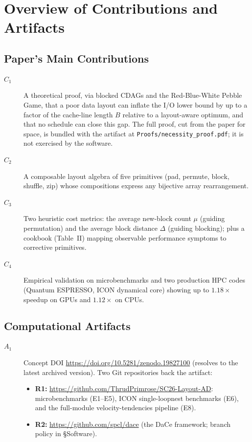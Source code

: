 \documentclass[conference]{IEEEtran}
\begin{document}


\appendixAD

\section{Overview of Contributions and Artifacts}

\subsection{Paper's Main Contributions}

\begin{description}
\item[$C_1$] A theoretical proof, via blocked CDAGs and the Red-Blue-White Pebble Game, that a poor data layout can inflate the I/O lower bound by up to a factor of the cache-line length $B$ relative to a layout-aware optimum, and that no schedule can close this gap. The full proof, cut from the paper for space, is bundled with the artifact at \texttt{Proofs/necessity\_proof.pdf}; it is not exercised by the software.
\item[$C_2$] A composable layout algebra of five primitives (pad, permute, block, shuffle, zip) whose compositions express any bijective array rearrangement.
\item[$C_3$] Two heuristic cost metrics: the average new-block count $\mu$ (guiding permutation) and the average block distance $\Delta$ (guiding blocking); plus a cookbook (Table~II) mapping observable performance symptoms to corrective primitives.
\item[$C_4$] Empirical validation on microbenchmarks and two production HPC codes (Quantum ESPRESSO, ICON dynamical core) showing up to $1.18\times$ speedup on GPUs and $1.12\times$ on CPUs.
\end{description}

\subsection{Computational Artifacts}

\begin{description}
\item[$A_1$] Concept DOI \url{https://doi.org/10.5281/zenodo.19827100} (resolves to the latest archived version). Two Git repositories back the artifact:
  \begin{itemize}
  \item \textbf{R1:} \url{https://github.com/ThrudPrimrose/SC26-Layout-AD}: microbenchmarks (E1--E5), ICON single-loopnest benchmarks (E6), and the full-module velocity-tendencies pipeline (E8).
  \item \textbf{R2:} \url{https://github.com/spcl/dace} (the DaCe framework; branch policy in §Software).
  \end{itemize}
\end{description}
\end{document}
